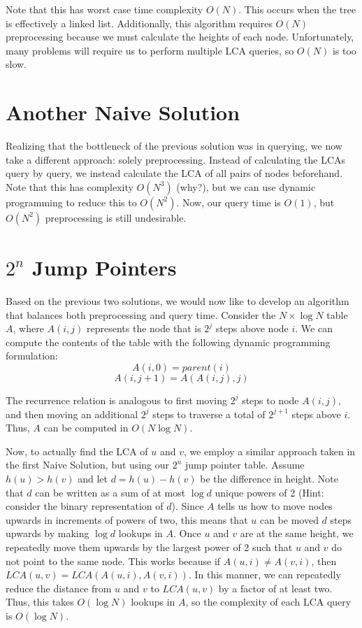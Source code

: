 \documentclass{article}
\begin{document}
Note that this has worst case time complexity $O(N)$. This occurs when the tree is effectively a linked list. Additionally, this algorithm requires $O(N)$ preprocessing because we must calculate the heights of each node. Unfortunately, many problems will require us to perform multiple LCA queries, so $O(N)$ is too slow. 


\section {Another Naive Solution}

Realizing that the bottleneck of the previous solution was in querying, we now take a different approach: solely preprocessing. Instead of calculating the LCAs query by query, we instead calculate the LCA of all pairs of nodes beforehand. Note that this has complexity $O(N^3)$ (why?), but we can use dynamic programming to reduce this to $O(N^2)$. Now, our query time is $O(1)$, but $O(N^2)$ preprocessing is still undesirable. 


\section {$2^n$ Jump Pointers}

Based on the previous two solutions, we would now like to develop an algorithm that balances both preprocessing and query time. Consider the $N \times \log N$ table $A$, where $A(i, j)$ represents the node that is $2^j$ steps above node $i$. We can compute the contents of the table with the following dynamic programming formulation: 
$$A(i, 0) = parent(i)$$
$$A(i, j+1) = A( A(i, j), j )$$

\noindent The recurrence relation is analogous to first moving $2^j$ steps to node $A(i, j)$, and then moving an additional $2^j$ steps to traverse a total of $2^{j+1}$ steps above $i$. Thus, $A$ can be computed in $O(N \log N)$. 

Now, to actually find the LCA of $u$ and $v$, we employ a similar approach taken in the first Naive Solution, but using our $2^n$ jump pointer table. Assume $h(u) > h(v)$ and let $d = h(u) - h(v)$ be the difference in height. Note that $d$ can be written as a sum of at most $\log d$ unique powers of 2 (Hint: consider the binary representation of $d$). Since $A$ tells us how to move nodes upwards in increments of powers of two, this means that $u$ can be moved $d$ steps upwards by making $\log d$ lookups in $A$. Once $u$ and $v$ are at the same height, we repeatedly move them upwards by the largest power of 2 such that $u$ and $v$ do not point to the same node. This works because if $A(u, i) \neq A(v, i)$, then $LCA(u, v) = LCA(A(u, i), A(v, i))$. In this manner, we can repeatedly reduce the distance from $u$ and $v$ to $LCA(u, v)$ by a factor of at least two.  Thus, this takes $O(\log N)$ lookups in $A$, so the complexity of each LCA query is $O(\log N)$. 
\end{document}
